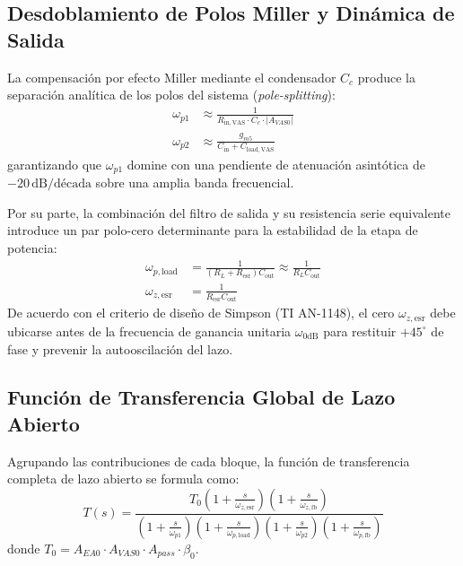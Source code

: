 \subsection{Desdoblamiento de Polos Miller y Dinámica de Salida}

La compensación por efecto Miller mediante el condensador $C_c$ produce la separación analítica de los polos del sistema (\textit{pole-splitting}):
\begin{align}
    \omega_{p1} &\approx \frac{1}{R_{\mathrm{in,VAS}} \cdot C_c \cdot |A_{VAS0}|} \label{eq:pole_miller} \\
    \omega_{p2} &\approx \frac{g_{m5}}{C_{\mathrm{in}} + C_{\mathrm{load,VAS}}} \label{eq:pole_split_high}
\end{align}
garantizando que $\omega_{p1}$ domine con una pendiente de atenuación asintótica de $-20\,\mathrm{dB}/\text{década}$ sobre una amplia banda frecuencial.

Por su parte, la combinación del filtro de salida y su resistencia serie equivalente introduce un par polo-cero determinante para la estabilidad de la etapa de potencia:
\begin{align}
    \omega_{p,\mathrm{load}} &= \frac{1}{(R_L + R_{\mathrm{esr}}) C_{\mathrm{out}}} \approx \frac{1}{R_L C_{\mathrm{out}}} \\
    \omega_{z,\mathrm{esr}} &= \frac{1}{R_{\mathrm{esr}} C_{\mathrm{out}}} \label{eq:zero_esr}
\end{align}
De acuerdo con el criterio de diseño de Simpson (TI AN-1148), el cero $\omega_{z,\mathrm{esr}}$ debe ubicarse antes de la frecuencia de ganancia unitaria $\omega_{0\mathrm{dB}}$ para restituir $+45^\circ$ de fase y prevenir la autooscilación del lazo.

\subsection{Función de Transferencia Global de Lazo Abierto}

Agrupando las contribuciones de cada bloque, la función de transferencia completa de lazo abierto se formula como:
\begin{equation}
    T(s) = \frac{T_0 \left( 1 + \frac{s}{\omega_{z,\mathrm{esr}}} \right) \left( 1 + \frac{s}{\omega_{z,\mathrm{fb}}} \right)}{\left( 1 + \frac{s}{\omega_{p1}} \right) \left( 1 + \frac{s}{\omega_{p,\mathrm{load}}} \right) \left( 1 + \frac{s}{\omega_{p2}} \right) \left( 1 + \frac{s}{\omega_{p,\mathrm{fb}}} \right)}
    \label{eq:loop_gain_transfer}
\end{equation}
donde $T_0 = A_{EA0} \cdot A_{VAS0} \cdot A_{pass} \cdot \beta_0$.

